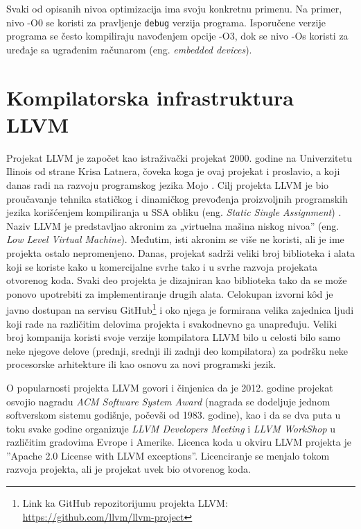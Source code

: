 \documentclass[12pt,oneside]{memoir}
\begin{document}
Svaki od opisanih nivoa optimizacija ima svoju konkretnu primenu. Na primer, nivo -O0 se koristi za pravljenje \texttt{debug} verzija programa. Isporučene verzije programa se često kompiliraju navođenjem opcije -O3, dok se nivo -Os koristi za uređaje sa ugrađenim računarom (eng. \textit{embedded devices}).

\section{Kompilatorska infrastruktura LLVM}
Projekat LLVM \cite{llvm} je započet kao istraživački projekat 2000. godine na Univerzitetu Ilinois od strane Krisa Latnera, čoveka koga je ovaj projekat i proslavio, a koji danas radi na razvoju programskog jezika Mojo \cite{mojo}. Cilj projekta LLVM je bio proučavanje tehnika statičkog i dinamičkog prevođenja proizvoljnih programskih jezika korišćenjem kompiliranja u SSA obliku (eng. \textit{Static Single Assignment}) \cite{ssa_form}. Naziv LLVM je predstavljao akronim za „virtuelna 
mašina niskog nivoa” (eng. \textit{Low Level Virtual Machine}). Međutim, isti akronim se 
više ne koristi, ali je ime projekta ostalo nepromenjeno. Danas, projekat 
sadrži veliki broj biblioteka i alata koji se koriste kako u komercijalne svrhe 
tako i u svrhe razvoja projekata otvorenog koda. Svaki deo projekta je 
dizajniran kao biblioteka tako da se može ponovo upotrebiti za implementiranje 
drugih alata. Celokupan izvorni kôd je javno dostupan na servisu 
GitHub\footnote{Link ka GitHub repozitorijumu projekta LLVM: \href{https://github.com/llvm/llvm-project}{https://github.com/llvm/llvm-project}}
i oko njega je 
formirana velika zajednica ljudi koji rade na različitim delovima projekta i 
svakodnevno ga unapređuju. Veliki broj kompanija koristi svoje verzije 
kompilatora LLVM bilo u celosti bilo samo neke njegove delove (prednji, srednji 
ili zadnji deo kompilatora) za podršku neke procesorske arhitekture ili kao 
osnovu za novi programski jezik. 

O popularnosti projekta LLVM govori i činjenica da je 2012. godine projekat osvojio nagradu 
\textit{ACM Software System Award} \cite{acm} (nagrada se dodeljuje jednom softverskom sistemu 
godišnje, počevši od 1983. godine), kao i da se dva puta u toku svake godine organizuje \textit{LLVM 
Developers Meeting} i \textit{LLVM WorkShop} u različitim gradovima Evrope i Amerike. Licenca koda u okviru 
LLVM projekta je ”Apache 2.0 License with LLVM exceptions”. Licenciranje se menjalo tokom razvoja 
projekta, ali je projekat uvek bio otvorenog koda.
\end{document}
